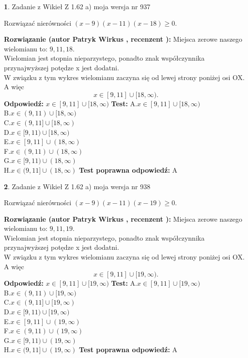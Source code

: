 \documentclass[12pt, a4paper]{article}
\theoremstyle{definition} %
\newtheorem{zad}{}
\newcommand{\zadStart}[1]{\begin{zad}#1\newline}
\newcommand{\zadStop}{\end{zad}}
\newcommand{\rozwStart}[2]{\noindent \textbf{Rozwiązanie (autor #1 , recenzent #2): }\newline}
\newcommand{\rozwStop}{\newline}
\newcommand{\odpStart}{\noindent \textbf{Odpowiedź:}\newline}
\newcommand{\odpStop}{\newline}
\newcommand{\testStart}{\noindent \textbf{Test:}\newline}
\newcommand{\testStop}{\newline}
\newcommand{\kluczStart}{\noindent \textbf{Test poprawna odpowiedź:}\newline}
\newcommand{\kluczStop}{\newline}
\begin{document}
\zadStart{Zadanie z Wikieł Z 1.62 a) moja wersja nr 937}

Rozwiązać nierówności $(x-9)(x-11)(x-18)\ge0$.
\zadStop
\rozwStart{Patryk Wirkus}{}
Miejsca zerowe naszego wielomianu to: $9, 11, 18$.\\
Wielomian jest stopnia nieparzystego, ponadto znak współczynnika przy\linebreak najwyższej potędze x jest dodatni.\\ W związku z tym wykres wielomianu zaczyna się od lewej strony poniżej osi OX. A więc $$x \in [9,11] \cup [18,\infty).$$
\rozwStop
\odpStart
$x \in [9,11] \cup [18,\infty)$
\odpStop
\testStart
A.$x \in [9,11] \cup [18,\infty)$\\
B.$x \in (9,11) \cup [18,\infty)$\\
C.$x \in (9,11] \cup [18,\infty)$\\
D.$x \in [9,11) \cup [18,\infty)$\\
E.$x \in [9,11] \cup (18,\infty)$\\
F.$x \in (9,11) \cup (18,\infty)$\\
G.$x \in [9,11) \cup (18,\infty)$\\
H.$x \in (9,11] \cup (18,\infty)$
\testStop
\kluczStart
A
\kluczStop



\zadStart{Zadanie z Wikieł Z 1.62 a) moja wersja nr 938}

Rozwiązać nierówności $(x-9)(x-11)(x-19)\ge0$.
\zadStop
\rozwStart{Patryk Wirkus}{}
Miejsca zerowe naszego wielomianu to: $9, 11, 19$.\\
Wielomian jest stopnia nieparzystego, ponadto znak współczynnika przy\linebreak najwyższej potędze x jest dodatni.\\ W związku z tym wykres wielomianu zaczyna się od lewej strony poniżej osi OX. A więc $$x \in [9,11] \cup [19,\infty).$$
\rozwStop
\odpStart
$x \in [9,11] \cup [19,\infty)$
\odpStop
\testStart
A.$x \in [9,11] \cup [19,\infty)$\\
B.$x \in (9,11) \cup [19,\infty)$\\
C.$x \in (9,11] \cup [19,\infty)$\\
D.$x \in [9,11) \cup [19,\infty)$\\
E.$x \in [9,11] \cup (19,\infty)$\\
F.$x \in (9,11) \cup (19,\infty)$\\
G.$x \in [9,11) \cup (19,\infty)$\\
H.$x \in (9,11] \cup (19,\infty)$
\testStop
\kluczStart
A
\kluczStop
\end{document}
